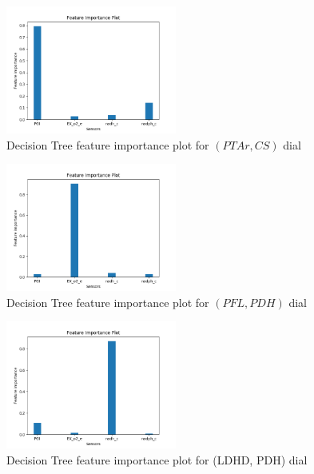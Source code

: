 \documentclass[12pt,chapterheads]{ucsd}
\begin{document}
\begin{figure}[h] 
\centering
\includegraphics[width=0.5\textwidth]{PTAr_CS_dtr_important_features}
\caption[Decision Tree feature importance plot for $(PTAr, CS)$ dial]
{Decision Tree feature importance plot for $(PTAr, CS)$ dial}
\label{fig:PtarCsDtrImp}
\end{figure}

\begin{figure}[h] 
\centering
\includegraphics[width=0.5\textwidth]{PFL_PDH_dtr_important_features}
\caption[Decision Tree feature importance plot for $(PFL, PDH)$ dial]
{Decision Tree feature importance plot for $(PFL, PDH)$ dial}
\label{fig:PflPdhDtrImp}
\end{figure}

\begin{figure}[h] 
\centering
\includegraphics[width=0.5\textwidth]{LDH_D_PDH_dtr_important_features}
\caption[Decision Tree feature importance plot for \string(LDH\textunderscore D, PDH) dial]
{Decision Tree feature importance plot for \string(LDH\textunderscore D, PDH) dial}
\label{fig:LdhPdhDtrImp}
\end{figure}
\end{document}
